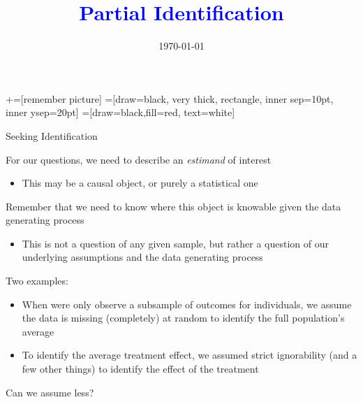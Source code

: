 \documentclass[notes,11pt, aspectratio=169]{beamer}
\title[]{\textcolor{blue}{Partial Identification}} \author[PGP]{}
\institute[FRBNY]{\small{\begin{tabular}{c}
                           Paul Goldsmith-Pinkham  \\
\end{tabular}}}
\date{\today}
\newenvironment{wideitemize}{\itemize\addtolength{\itemsep}{10pt}}{\enditemize}
\begin{document}
\newcommand\marktopleft[1]{%
    \tikz[overlay,remember picture] 
        \node (marker-#1-a) at (-.3em,.3em) {};%
}
\newcommand\markbottomright[2]{%
    \tikz[overlay,remember picture] 
        \node (marker-#1-b) at (0em,0em) {};%
}
+=[remember picture] 
 =[draw=black, very thick, rectangle, inner sep=10pt, inner ysep=20pt]
 =[draw=black,fill=red, text=white]

\begin{frame}
\maketitle
\end{frame}

\begin{frame}{Seeking Identification}
  \begin{wideitemize}
  \item For our questions, we need to describe an \emph{estimand} of
    interest
    \begin{itemize}
    \item This may be a causal object, or purely a statistical one
    \end{itemize}
    \item Remember that we need to know where this object is knowable
      given the data generating process
      \begin{itemize}
      \item This is not a question of any given sample, but rather a
        question of our underlying assumptions and the data generating
        process
      \end{itemize}
    \item Two examples:
      \begin{itemize}
      \item When were only observe a subsample of outcomes for
        individuals, we assume the data is missing (completely) at
        random to identify the full population's average
      \item To identify the average treatment effect, we
        assumed strict ignorability (and a few other things) to
        identify the effect of the treatment
      \end{itemize}
    \item Can we assume less?
  \end{wideitemize}
\end{frame}
\end{document}
